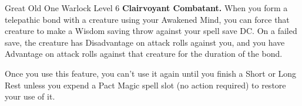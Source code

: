 \begin{Card}[Class]{Great Old One Warlock Level 6}
\textbf{Clairvoyant Combatant.} When you form a telepathic bond with a creature using your Awakened Mind, you can force that creature to make a Wisdom saving throw against your spell save DC. On a failed save, the creature has Disadvantage on attack rolls against you, and you have Advantage on attack rolls against that creature for the duration of the bond.

Once you use this feature, you can't use it again until you finish a Short or Long Rest unless you expend a Pact Magic spell slot (no action required) to restore your use of it.
\end{Card}

